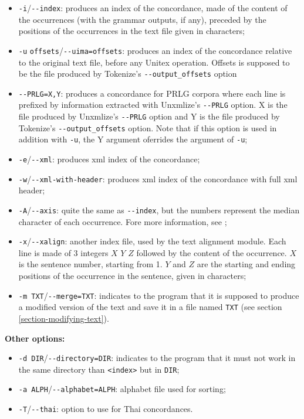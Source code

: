 \begin{itemize}
  \item \verb+-i+/\verb+--index+: produces an index of the concordance, made of the
    content of the occurrences (with the grammar outputs, if any), preceded by
    the positions of the occurrences in the text file given in characters;
  \item \verb+-u+ \verb+offsets+/\verb+--uima=offsets+: produces an index of the 
  concordance relative to the original text file, before any Unitex operation. Offsets 
  is supposed to be the file produced by Tokenize's \verb+--output_offsets+ option
  \item \verb+--PRLG=X,Y+: produces a concordance for PRLG corpora where each line
  is prefixed by information extracted with Unxmlize's \verb+--PRLG+ option. X is the 
  file produced by Unxmlize's \verb+--PRLG+ option and Y is the file produced by Tokenize's
  \verb+--output_offsets+ option. Note that if this option is used in addition with \verb+-u+, 
  the Y argument oferrides the argument of \verb+-u+;
  \item \verb+-e+/\verb+--xml+: produces xml index of the concordance;
  \item \verb+-w+/\verb+--xml-with-header+: produces xml index of the concordance with full xml header;
  \item \verb+-A+/\verb+--axis+: quite the same as \verb+--index+, but the numbers
    represent the median character of each occurrence. Fore more information,
    see \cite{axis};
  \item \verb+-x+/\verb+--xalign+: another index file, used by the text alignment module.
    Each line is made of 3 integers $X$ $Y$ $Z$ followed by the content of the 
    occurrence. $X$ is the sentence number, starting from 1. $Y$ and $Z$ are the
    starting and ending positions of the occurrence in the sentence, given in
    characters;
  \item \verb+-m TXT+/\verb+--merge=TXT+: indicates to the program that it is supposed to
    produce a modified version of the text and save it in a file named
    \verb+TXT+ (see section \ref{section-modifying-text}).
\end{itemize}

\bigskip
\noindent \textbf{Other options:}
\begin{itemize}
  \item \verb+-d DIR+/\verb+--directory=DIR+: indicates to the program that
  it must not work in the same directory than \verb+<index>+ but in \verb+DIR+;
  \item \verb+-a ALPH+/\verb+--alphabet=ALPH+: alphabet file used for sorting;
  \item \verb+-T+/\verb+--thai+: option to use for Thai concordances.
\end{itemize}

